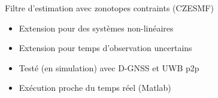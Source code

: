 \documentclass[aspectratio=169]{neocampus}
\begin{document}
\begin{frame}{Filtre d'estimation avec zonotopes contraints (CZESMF) \hyperlink{czesmf_algo}{}}
\hypertarget{czesmf_presentation}{}
  \begin{minipage}[c]{.6\linewidth}
    \begin{itemize}
      \item Extension pour des systèmes non-linéaires
      \item Extension pour temps d'observation uncertains
      \item Testé (en simulation) avec D-GNSS et UWB p2p
      \item Exécution proche du temps réel (Matlab)
    \end{itemize}
  \end{minipage}
  \begin{minipage}[c]{.3\linewidth}
    \centering
  \end{minipage}

\end{frame}
\end{document}
